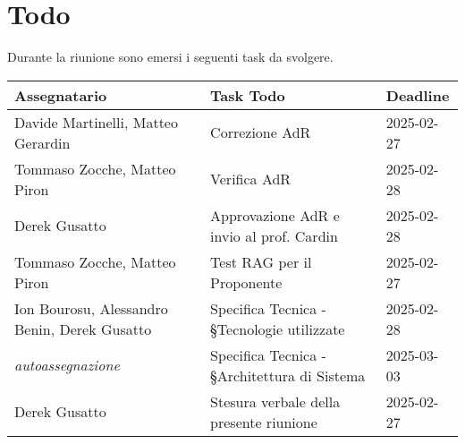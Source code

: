 \section{Todo}
Durante la riunione sono emersi i seguenti task da svolgere.

\begin{center}
  \begin{tabular}{|L{4cm}|L{6cm}|L{3cm}|}
    \hline
    \textbf{Assegnatario} & \textbf{Task Todo} & \textbf{Deadline} \\ \hline
    Davide Martinelli, Matteo Gerardin &  Correzione AdR &  2025-02-27 \\ \hline
    Tommaso Zocche, Matteo Piron &  Verifica AdR &  2025-02-28 \\ \hline
    Derek Gusatto &  Approvazione AdR e invio al prof. Cardin &  2025-02-28 \\ \hline
    Tommaso Zocche, Matteo Piron &  Test RAG per il Proponente &  2025-02-27 \\ \hline
    Ion Bourosu, Alessandro Benin, Derek Gusatto &  Specifica Tecnica - §Tecnologie utilizzate &  2025-02-28\\ \hline
    \textit{autoassegnazione} &  Specifica Tecnica - §Architettura di Sistema &  2025-03-03 \\ \hline
    Derek Gusatto &  Stesura verbale della presente riunione &  2025-02-27 \\ \hline
  \end{tabular}
\end{center}